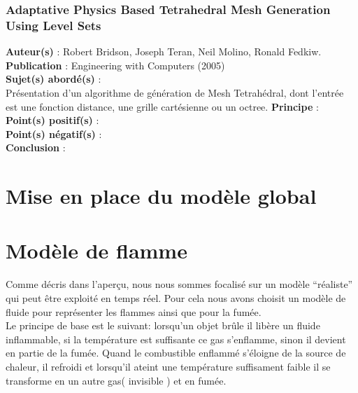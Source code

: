 \documentclass[a4paper,10pt]{article}
\begin{document}
\subsubsection{Adaptative Physics Based Tetrahedral Mesh Generation Using Level Sets}
\textbf{Auteur(s)} : Robert Bridson, Joseph Teran, Neil Molino, Ronald Fedkiw.\\
\textbf{Publication} : Engineering with Computers (2005)\\
\textbf{Sujet(s) abordé(s)} : \\
	Présentation d'un algorithme de génération de Mesh Tetrahédral, dont l'entrée est une fonction distance, une grille cartésienne ou un octree.
\textbf{Principe} :\\	
\textbf{Point(s) positif(s)} :\\
\textbf{Point(s) négatif(s)} :\\
\textbf{Conclusion} :\\









\section{Mise en place du modèle global}




\section{Modèle de flamme}
Comme décris dans l'aperçu, nous nous sommes focalisé sur un modèle
``réaliste'' qui peut être exploité en temps réel. Pour cela nous
avons choisit un modèle de fluide pour représenter les flammes ainsi
que pour la fumée.\\

Le principe de base est le suivant: lorsqu'un objet brûle il libère un
fluide inflammable, si la température est suffisante ce gas
s'enflamme, sinon il devient en partie de la fumée. Quand le
combustible enflammé s'éloigne de la source de chaleur, il refroidi et
lorsqu'il ateint une température suffisament faible il se transforme
en un autre gas( invisible ) et en fumée.\\
\end{document}
